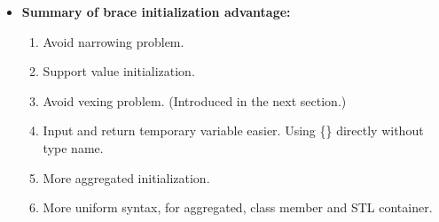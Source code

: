 \documentclass[a4paper,11pt,twoside]{book}
\begin{document}
\begin{itemize}
	\item \textbf{Summary of brace initialization advantage:}
\begin{enumerate}
	\item Avoid narrowing problem.
	\item Support value initialization.
	\item Avoid vexing problem. (Introduced in the next section.)
	\item Input and return temporary variable easier. Using \{\} directly without type name. 
	\item More aggregated initialization.
	\item More uniform syntax, for aggregated, class member and STL container. 
\end{enumerate}
\end{itemize}
\end{document}
